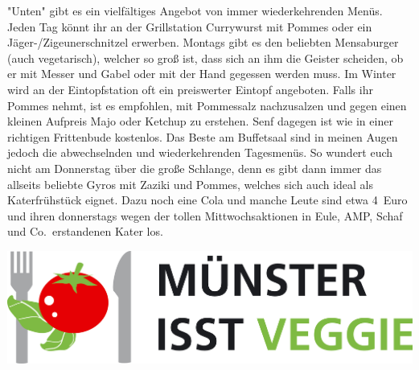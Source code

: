\begin{multicols*}{2}
\begin{center}
\end{center}

"Unten" gibt es ein vielfältiges Angebot von immer wiederkehrenden Menüs.
Jeden Tag könnt ihr an der Grillstation Currywurst mit Pommes oder ein Jäger-/Zigeunerschnitzel erwerben.
Montags gibt es den beliebten Mensaburger (auch vegetarisch), welcher so groß ist, dass sich an ihm die Geister scheiden, ob er mit Messer und Gabel oder mit der Hand gegessen werden muss.
Im Winter wird an der Eintopfstation oft ein preiswerter Eintopf angeboten.
Falls ihr Pommes nehmt, ist es empfohlen, mit Pommessalz nachzusalzen und gegen einen kleinen Aufpreis Majo oder Ketchup zu erstehen.
Senf dagegen ist wie in einer richtigen Frittenbude kostenlos.
Das Beste am Buffetsaal sind in meinen Augen jedoch die abwechselnden und wiederkehrenden Tagesmenüs.
So wundert euch nicht am Donnerstag über die große Schlange, denn es gibt dann immer das allseits beliebte Gyros mit Zaziki und Pommes, welches sich auch ideal als Katerfrühstück eignet.
Dazu noch eine Cola und manche Leute sind etwa 4~Euro und ihren donnerstags wegen der tollen Mittwochsaktionen in Eule, AMP, Schaf und Co.\ erstandenen Kater los.

\includegraphics[width=\columnwidth]{res/muenster_isst_veggie.png}


\end{multicols*}
